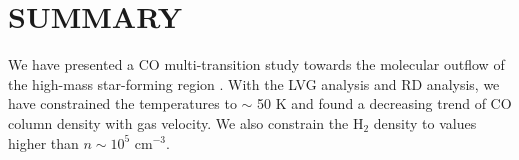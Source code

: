 \section{SUMMARY}\label{summary}

We have presented a CO multi-transition study towards the molecular outflow of the high-mass star-forming region . With the LVG analysis and RD analysis, we have constrained the temperatures to $\sim$ 50 K and found a decreasing trend of CO column density with gas velocity. We also constrain the H$_2$ density to values higher than $n \sim 10^5$ cm$^{-3}$. 
